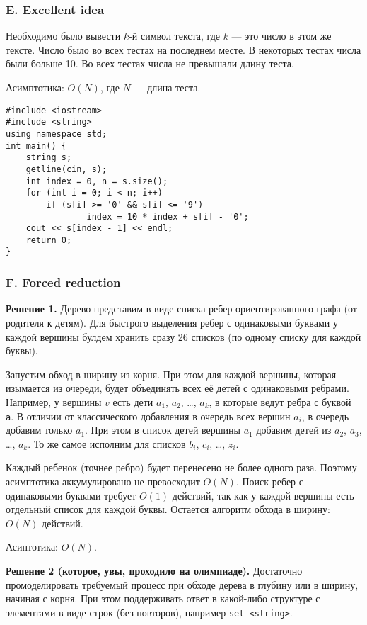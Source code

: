 \subsubsection*{E. Excellent idea}

Необходимо было вывести $k$-й символ текста, где $k$ --- это число в этом же тексте. Число было во всех тестах на последнем месте. В некоторых тестах числа были больше 10. Во всех тестах числа не превышали длину теста.

Асимптотика: $O(N)$, где $N$ --- длина теста.

\begin{lstlisting}
#include <iostream>
#include <string>
using namespace std;
int main() {
    string s;
    getline(cin, s);
    int index = 0, n = s.size();
    for (int i = 0; i < n; i++)
        if (s[i] >= '0' && s[i] <= '9')
                index = 10 * index + s[i] - '0';
    cout << s[index - 1] << endl;
    return 0;
}
\end{lstlisting}


\subsubsection*{F. Forced reduction}

\textbf{Решение 1.} Дерево представим в виде списка ребер ориентированного графа (от родителя к детям). Для быстрого выделения ребер с одинаковыми буквами у каждой вершины булдем хранить сразу 26 списков (по одному списку для каждой буквы).

Запустим обход в ширину из корня. При этом для каждой вершины, которая изымается из очереди, будет объединять всех её детей с одинаковыми ребрами. Например, у вершины $v$ есть дети $a_1$, $a_2$, \dots, $a_k$, в которые ведут ребра с буквой {\tt a}. В отличии от классического добавления в очередь всех вершин $a_i$, в очередь добавим только $a_1$. При этом в список детей вершины $a_1$ добавим детей из $a_2$, $a_3$, \dots, $a_k$. То же самое исполним для списков $b_i$, $c_i$, \dots, $z_i$.

Каждый ребенок (точнее ребро) будет перенесено не более одного раза. Поэтому асимптотика аккумулировано не превосходит $O(N)$. Поиск ребер с одинаковыми буквами требует $O(1)$ действий, так как у каждой вершины есть отдельный список для каждой буквы. Остается алгоритм обхода в ширину: $O(N)$ действий.  

Асиптотика: $O(N)$.

\textbf{Решение 2 (которое, увы, проходило на олимпиаде).} Достаточно промоделировать требуемый процесс при обходе дерева в глубину или в ширину, начиная с корня. При этом поддерживать ответ в какой-либо структуре с элементами в виде строк (без повторов), например {\tt set <string>}.

